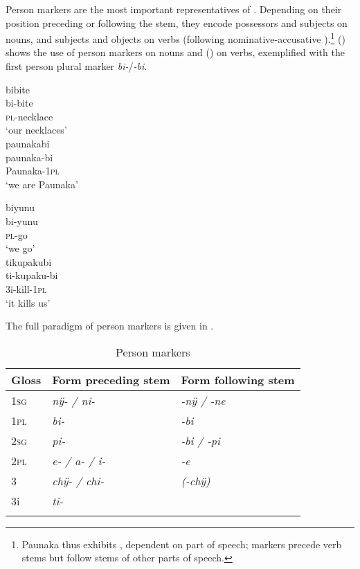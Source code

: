 Person markers are the most important representatives of . Depending on their position preceding or following the stem, they encode possessors and subjects on nouns, and subjects and objects on verbs (following nominative-accusative ).\footnote{Paunaka thus exhibits , dependent on part of speech;  markers precede verb stems but follow stems of other parts of speech.} () shows the use of person markers on nouns and () on verbs, exemplified with the first person plural marker \textit{bi-}/\textit{-bi}.

\ea\label{ex:Sketch-Pers-N}
  \ea
\begingl
\glpreamble bibite\\
\gla bi-bite\\
\textsc{pl}-necklace\\
\glft ‘our necklaces’\\
\endgl
  \ex
\begingl
\glpreamble paunakabi\\
\gla paunaka-bi\\
\glb Paunaka-1\textsc{pl}\\
\glft ‘we are Paunaka’\\
\endgl
\z
\xe

\ea\label{ex:Sketch-Pers-V}
  \ea\label{ex:Sketch-Pers-V.1}
\begingl
\glpreamble biyunu\\
\gla bi-yunu\\
\textsc{pl}-go\\
\glft ‘we go’\\
\endgl
  \ex\label{ex:Sketch-Pers-V.2}
\begingl
\glpreamble tikupakubi\\
\gla ti-kupaku-bi\\
\glb 3i-kill-1\textsc{pl}\\
\glft ‘it kills us’\\
\endgl
\z
\xe

The full paradigm of person markers is given in .

\begin{table}
\caption{Person markers}

\begin{tabular}{lll}
\lsptoprule
Gloss & Form preceding stem & Form following stem \\
\midrule
1\textsc{sg} & \textit{nÿ- / ni-} & \textit{-nÿ / -ne} \\
1\textsc{pl} & \textit{bi-} & \textit{-bi} \\
2\textsc{sg} & \textit{pi-} & \textit{-bi / -pi} \\
2\textsc{pl} & \textit{e- / a- / i-} & \textit{-e} \\
3 & \textit{chÿ- / chi-} & \textit{(-chÿ)}\\
3i & \textit{ti-} & \\
\lspbottomrule
\end{tabular}

\label{table:Sketch-PersonMarkers}
\end{table}

